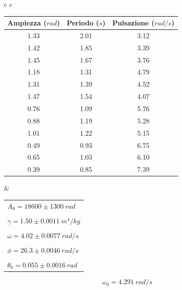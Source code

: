 \begin{center}

\begin{tabular}{c c}

\begin{tabular}{c | c | c}

\textbf{Ampiezza} ($rad$) & \textbf{Periodo} ($s$) & \textbf{Pulsazione} ($rad/s$)\\
\midrule
1.33 & 2.01 & 3.12\\
1.42 & 1.85 & 3.39\\
1.45 & 1.67 & 3.76\\
1.18 & 1.31 & 4.79\\
1.31 & 1.39 & 4.52\\
1.47 & 1.54 & 4.07\\
0.76 & 1.09 & 5.76\\
0.88 & 1.19 & 5.28\\
1.01 & 1.22 & 5.15\\
0.49 & 0.93 & 6.75\\
0.65 & 1.03 & 6.10\\
0.39 & 0.85 & 7.39\\

\end{tabular}

& \hspace{1cm}

\begin{tabular}{l}

$A_0 = 18600 \pm 1300\ rad$ \\
\\
$\gamma= 1.50 \pm 0.0011\ m^4/kg$\\
\\
$\omega = 4.02 \pm 0.0077\ rad/s$\\
\\
$\phi =  26.3 \pm 0.0046 \ rad/s$ \\
\\
$\theta_0 = 0.055 \pm 0.0016\ rad$ \\

\end{tabular}

\end{tabular}

\end{center}


$$\omega_{0} = 4.291\ rad/s $$

